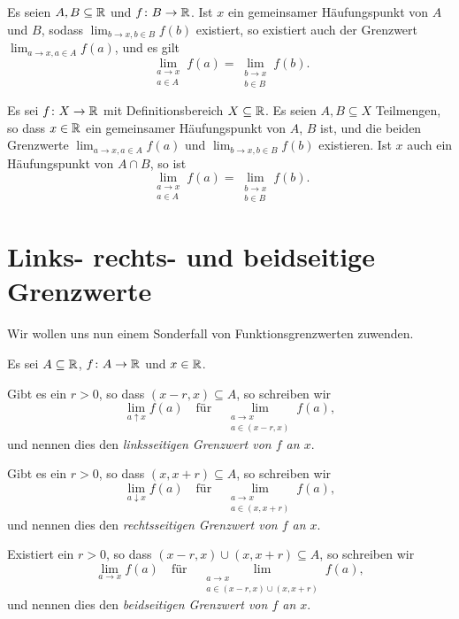 \documentclass[a4paper,10pt]{article}
\begin{document}
\begin{lem}\label{lem: Grenzwerte auf Teilmengen}
 Es seien $A, B \subseteq \mathbb{R}$ und $f \colon B \to \mathbb{R}$. Ist $x$ ein gemeinsamer Häufungspunkt von $A$ und $B$, sodass $\lim_{b \to x, b \in B} f(b)$ existiert, so existiert auch der Grenzwert $\lim_{a \to x, a \in A} f(a)$, und es gilt
 \[
  \lim_{\substack{a \to x \\ a \in A}} f(a)
  = \lim_{\substack{b \to x \\ b \in B}} f(b).
 \]
\end{lem}


\begin{kor}
 Es sei $f \colon X \to \mathbb{R}$ mit Definitionsbereich $X \subseteq \mathbb{R}$. Es seien $A, B \subseteq X$ Teilmengen, so dass $x \in \mathbb{R}$ ein gemeinsamer Häufungspunkt von $A$, $B$ ist, und die beiden Grenzwerte $\lim_{a \to x, a \in A} f(a)$ und $\lim_{b \to x, b \in B} f(b)$ existieren. Ist $x$ auch ein Häufungspunkt von $A \cap B$, so ist
 \[
  \lim_{\substack{a \to x \\ a \in A}} f(a)
  = \lim_{\substack{b \to x \\ b \in B}} f(b).
 \]
\end{kor}





\section{Links- rechts- und beidseitige Grenzwerte}
Wir wollen uns nun einem Sonderfall von Funktionsgrenzwerten zuwenden.


\begin{defi}
 Es sei $A \subseteq \mathbb{R}$, $f \colon A \to \mathbb{R}$ und $x \in \mathbb{R}$.
 
 Gibt es ein $r > 0$, so dass $(x-r, x) \subseteq A$, so schreiben wir
 \[
  \lim_{a \uparrow x} f(a)
  \quad
  \text{für}
  \quad
  \lim_{\substack{a \to x \\ a \in (x-r,x)}} f(a),
 \]
 und nennen dies den \emph{linksseitigen Grenzwert von $f$ an $x$}.
 
 Gibt es ein $r > 0$, so dass $(x,x+r) \subseteq A$, so schreiben wir
 \[
  \lim_{a \downarrow x} f(a)
  \quad
  \text{für}
  \quad
  \lim_{\substack{a \to x \\ a \in (x,x+r)}} f(a),
 \]
 und nennen dies den \emph{rechtsseitigen Grenzwert von $f$ an $x$}.
 
 Existiert ein $r > 0$, so dass $(x-r,x) \cup (x,x+r) \subseteq A$, so schreiben wir
 \[
  \lim_{a \to x} f(a)
  \quad
  \text{für}
  \quad
  \lim_{\substack{a \to x \\ a \in (x-r,x) \cup (x,x+r)}} f(a),
 \]
 und nennen dies den \emph{beidseitigen Grenzwert von $f$ an $x$}.
\end{defi}
\end{document}
